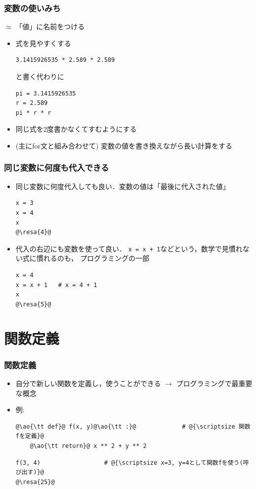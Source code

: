 \documentclass[10pt,dvipdfmx]{beamer}
\newcommand{\ore}[1]{{\color{orange}#1}}
\newcommand{\ao}[1]{{\color{blue}#1}}
\newcommand{\resa}[1]{\ore{\textsl{$\rightarrow$ #1}}}
\begin{document}
\begin{frame}[fragile]
  \frametitle{変数の使いみち}
  $\approx$ 「値」に名前をつける
  \begin{itemize}
  \item 式を見やすくする
\begin{lstlisting}
3.1415926535 * 2.589 * 2.589
\end{lstlisting}
と書く代わりに    
\begin{lstlisting}
pi = 3.1415926535
r = 2.589
pi * r * r
\end{lstlisting}
\item 同じ式を2度書かなくてすむようにする
\item (主にfor文と組み合わせて) 変数の値を書き換えながら長い計算をする
\end{itemize}
\end{frame}
  
\begin{frame}[fragile]
\frametitle{同じ変数に何度も代入できる}

\begin{itemize}
\item 同じ変数に何度代入しても良い．変数の値は「最後に代入された値」
\begin{lstlisting}
x = 3
x = 4
x
@\resa{4}@
\end{lstlisting}    
\item 代入の右辺にも変数を使って良い．
{\tt x = x + 1}などという，数学で見慣れない式に慣れるのも，
プログラミングの一部
\begin{lstlisting}
x = 4
x = x + 1   # x = 4 + 1
x
@\resa{5}@
\end{lstlisting}    
\end{itemize}
\end{frame}

\section{関数定義}

\begin{frame}[fragile]
\frametitle{関数定義}
\begin{itemize}
\item 自分で新しい関数を定義し，使うことができる
  $\rightarrow$ プログラミングで最重要な概念
\item 例:
\begin{lstlisting}
@\ao{\tt def}@ f(x, y)@\ao{\tt :}@             # @{\scriptsize 関数fを定義}@
    @\ao{\tt return}@ x ** 2 + y ** 2
\end{lstlisting}
\begin{lstlisting}
f(3, 4)                  # @{\scriptsize x=3, y=4として関数fを使う(呼び出す)}@
@\resa{25}@
\end{lstlisting}
\end{itemize}
\end{frame}
\end{document}
